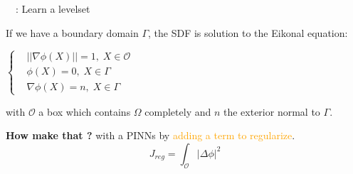 \begin{frame}{\appendixname~\theappendixframenumber~: Learn a levelset}
	\vspace{-10pt}
	\begin{tcolorbox}[
		colback=other, %
		colframe=other, %
		arc=2mm, %
		boxrule=0.5pt, %
		breakable, enhanced jigsaw,
		width=\linewidth,
		opacityback=0.1
		]
		
		If we have a boundary domain $\Gamma$, the SDF is solution to the Eikonal equation:
		
		\begin{minipage}{\linewidth}
			\centering
			$\left\{\begin{aligned}
				&||\nabla\phi(X)||=1, \; X\in\mathcal{O} \\
				&\phi(X)=0, \; X\in\Gamma \\
				&\nabla\phi(X)=n, \; X\in\Gamma
			\end{aligned}\right.$
		\end{minipage}
		
		with $\mathcal{O}$ a box which contains $\Omega$ completely and $n$ the exterior normal to $\Gamma$.
	\end{tcolorbox}
	
	\textbf{How make that ?} with a PINNs \cite{clemot_neural_2023} by \textcolor{orange}{adding a term to regularize}.
	\vspace{-5pt}
	\begin{equation*}
		J_{reg} = \int_\mathcal{O} |\Delta\phi|^2
	\end{equation*}

	\begin{minipage}{0.32\linewidth}
		\centering
	\end{minipage} 
	\begin{minipage}{0.32\linewidth}
		\centering
	\end{minipage} 
	\begin{minipage}{0.32\linewidth}
		\centering
	\end{minipage}
\end{frame}

